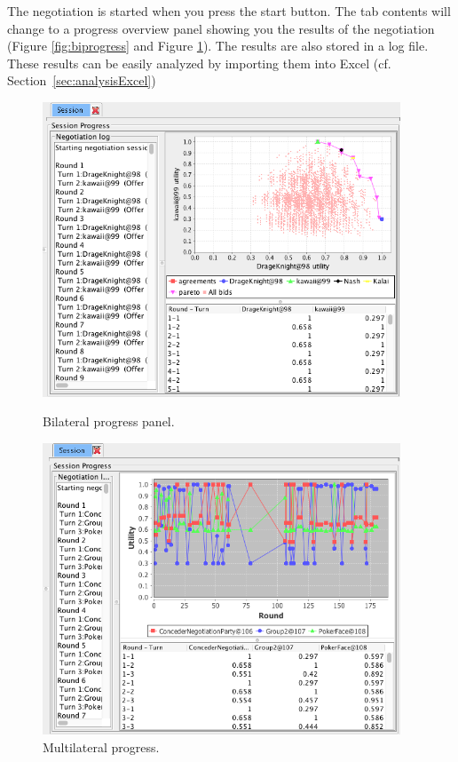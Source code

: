 \documentclass[]{article}
\begin{document}
The negotiation is started when you press the start button. The tab contents will change to  a progress overview panel
showing you the results of the negotiation (Figure \ref{fig:biprogress} and Figure \ref{fig:multiprogress}). The results are also stored in a log file.
 These results can be easily analyzed by importing them into Excel (cf. Section~\ref{sec:analysisExcel})

	\begin{figure}[ht]
		\center
		\begin{minipage}[b]{0.4\linewidth}
			\includegraphics[width=0.95\textwidth]{media/bilateralprogress.png}
		\caption{Bilateral progress panel.}
		\label{fig:biprogress}
		\end{minipage}
		\begin{minipage}[b]{0.4\linewidth}
			\includegraphics[width=0.95\textwidth]{media/multilateralprogress.png}
		\caption{Multilateral progress.}\label{fig:multiprogress}
		\end{minipage}
		\end{figure}
		
\end{document}
